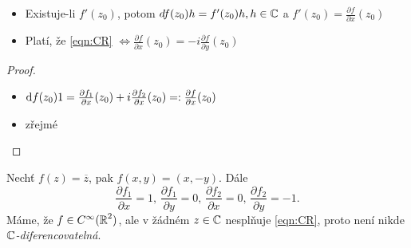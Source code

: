 
\begin{note}\mbox{}
\begin{itemize}
    \item Existuje-li $f'(z_0)$, potom $df(z_0)h = f'(z_0)h, h \in \operatorname{\mathbb{C}}  $ a $f'(z_0) = \frac{\partial f}{\partial x}(z_0)$ %
    \item Platí, že \cref{eqn:CR}
    $\iff \frac{\partial f}{\partial x}(z_0)    = -i\frac{\partial f}{\partial y}(z_0)$
\end{itemize}
\end{note}

\begin{proof}\mbox{}
\begin{itemize}
    \item $\mathop{}\!\mathrm{d} f(z_0)1 = \frac{\partial f_1}{\partial x}(z_0) + i\frac{\partial f_2}{\partial x}(z_0) =: \frac{\partial f}{\partial x}(z_0)$
    \item zřejmé %
\end{itemize}
\end{proof}

\begin{example}
Nechť $f(z) = \overline{z}$, pak $f(x,y) = (x,-y)$. %
Dále 
$$\frac{\partial f_1}{\partial x} = 1\text{, } \frac{\partial f_1}{\partial y} = 0\text{, } \frac{\partial f_2}{\partial x} = 0\text{, } \frac{\partial f_2}{\partial y} = -1\text{.}$$
Máme, že $f\in C^\infty(\operatorname{\mathbb{R}} ^2)$, ale v žádném $z\in \operatorname{\mathbb{C}}  $ nesplňuje \cref{eqn:CR}, proto není nikde\\ $\operatorname{\mathbb{C}}  $\emph{-diferencovatelná}.
\end{example}
